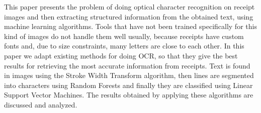 This paper presents the problem of doing optical character recognition on receipt images and then extracting structured information from the obtained text, using machine learning algorithms. Tools that have not been trained specifically for this kind of images do not handle them well usually, because receipts have custom fonts and, due to size constraints, many letters are close to each other. In this paper we adapt existing methods for doing OCR, so that they give the best results for retrieving the most accurate information from receipts. Text is found in images using the Stroke Width Transform algorithm, then lines are segmented into characters using Random Forests and finally they are classified using Linear Support Vector Machines. The results obtained by applying these algorithms are discussed and analyzed. 